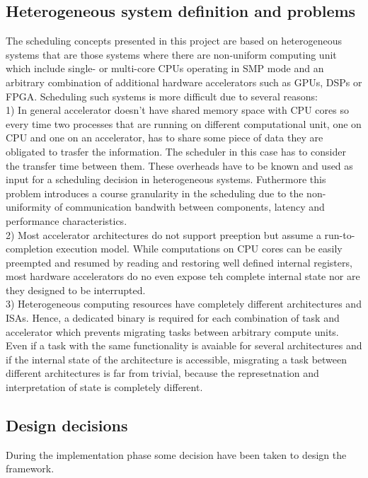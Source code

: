 \documentclass[a4paper,10pt]{article}
\begin{document}
\begin{multicols}{2}
\subsection{Heterogeneous system definition and problems}
The scheduling concepts presented in this project are based on heterogeneous systems that are 
those systems where there are non-uniform  computing unit which include single- or multi-core CPUs
operating in SMP mode and an arbitrary combination of additional hardware accelerators such as GPUs,
DSPs or FPGA.
Scheduling such systems is more difficult due to several reasons:\\
1) In general accelerator doesn't have shared memory space with CPU cores so every time two processes 
that are running on different computational unit, one on CPU and one on an accelerator, has to share
some piece of data they are obligated to trasfer the information. The scheduler in this case has to 
consider the transfer time between them. These overheads have to be known and used as input for a
scheduling decision in heterogeneous systems. Futhermore this problem introduces a course granularity 
in the scheduling due to the non-uniformity of communication bandwith between components, latency and
performance characteristics.\\
2) Most accelerator architectures do not support preeption but assume a run-to-completion execution
model. While computations on CPU cores can be easily preempted and resumed by reading and restoring
well defined internal registers, most hardware accelerators do no even expose teh complete internal
state nor are they designed to be interrupted.\\
3) Heterogeneous computing resources have completely different architectures and ISAs. Hence, 
a dedicated binary is required for each combination of task and accelerator which prevents migrating 
tasks between arbitrary compute units. Even if a task with the same functionality is avaiable for
several architectures and if the internal state of the architecture is accessible, misgrating a task
between different architectures is far from trivial, because the represetnation and interpretation of 
state is completely different.

\subsection{Design decisions}
During the implementation phase some decision have been taken to design the framework. \\







\end{multicols}
\end{document}

